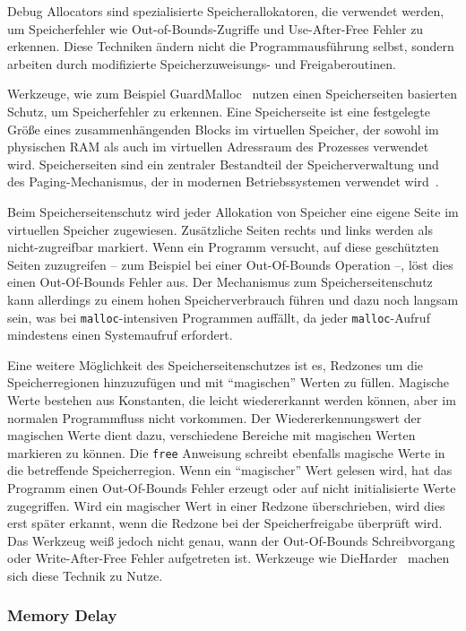 \documentclass[acmtog,nonacm]{acmart}
\begin{document}
Debug Allocators sind spezialisierte Speicherallokatoren, die verwendet werden,
um Speicherfehler wie Out-of-Bounds-Zugriffe und Use-After-Free Fehler zu
erkennen. Diese Techniken ändern nicht die Programmausführung selbst, sondern
arbeiten durch modifizierte Speicherzuweisungs- und Freigaberoutinen.

Werkzeuge, wie zum Beispiel GuardMalloc~\cite{guard-malloc_2024} nutzen einen
Speicherseiten basierten Schutz, um Speicherfehler zu erkennen. Eine
Speicherseite ist eine festgelegte Größe eines zusammenhängenden Blocks im
virtuellen Speicher, der sowohl im physischen RAM als auch im virtuellen
Adressraum des Prozesses verwendet wird. Speicherseiten sind ein zentraler
Bestandteil der Speicherverwaltung und des Paging-Mechanismus, der in modernen
Betriebssystemen verwendet wird~\cite{tanenbaum-modern_2015}.

Beim Speicherseitenschutz wird jeder Allokation von Speicher eine eigene Seite
im virtuellen Speicher zugewiesen. Zusätzliche Seiten rechts und links werden
als nicht-zugreifbar markiert. Wenn ein Programm versucht, auf diese
geschützten Seiten zuzugreifen -- zum Beispiel bei einer Out-Of-Bounds
Operation --, löst dies einen Out-Of-Bounds Fehler aus. Der Mechanismus zum
Speicherseitenschutz kann allerdings zu einem hohen Speicherverbrauch führen
und dazu noch langsam sein, was bei \verb|malloc|-intensiven Programmen
auffällt, da jeder \verb|malloc|-Aufruf mindestens einen Systemaufruf
erfordert.

Eine weitere Möglichkeit des Speicherseitenschutzes ist es, Redzones um die
Speicherregionen hinzuzufügen und mit "`magischen"' Werten zu füllen. Magische Werte bestehen aus Konstanten, die leicht wiedererkannt werden können, aber im normalen Programmfluss nicht vorkommen. Der Wiedererkennungswert der magischen Werte dient dazu, verschiedene Bereiche mit magischen Werten markieren zu können. Die \verb|free| Anweisung schreibt ebenfalls magische Werte in die betreffende
Speicherregion. Wenn ein "`magischer"' Wert gelesen wird, hat das Programm
einen Out-Of-Bounds Fehler erzeugt oder auf nicht initialisierte Werte
zugegriffen. Wird ein magischer Wert in einer Redzone überschrieben, wird dies
erst später erkannt, wenn die Redzone bei der Speicherfreigabe überprüft wird.
Das Werkzeug weiß jedoch nicht genau, wann der Out-Of-Bounds Schreibvorgang
oder Write-After-Free Fehler aufgetreten ist. Werkzeuge wie
DieHarder~\cite{die-harder_2010} machen sich diese Technik zu Nutze.

\subsubsection{Memory Delay}
\end{document}
